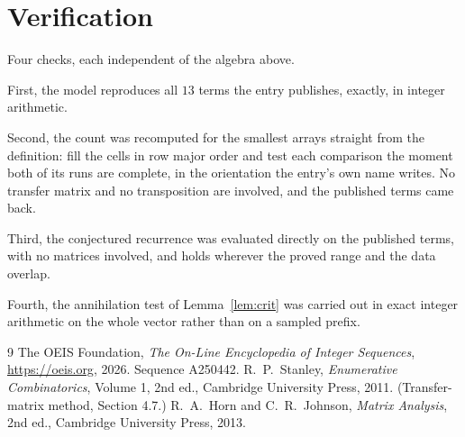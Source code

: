 \documentclass[11pt,a4paper]{article}
\theoremstyle{plain}
\theoremstyle{definition}
\begin{document}
\section{Verification}

Four checks, each independent of the algebra above.

First, the model reproduces all $13$ terms the entry publishes, exactly, in integer
arithmetic.

Second, the count was recomputed for the smallest arrays straight from the definition: fill the
cells in row major order and test each comparison the moment both of its runs are complete,
in the orientation the entry's own name writes. No transfer matrix and no transposition are
involved, and the published terms came back.

Third, the conjectured recurrence was evaluated directly on the published terms, with no
matrices involved, and holds wherever the proved range and the data overlap.

Fourth, the annihilation test of Lemma~\ref{lem:crit} was carried out in exact integer
arithmetic on the whole vector rather than on a sampled prefix.

\begin{thebibliography}{9}
 The OEIS Foundation, \emph{The On-Line Encyclopedia of Integer
Sequences}, \url{https://oeis.org}, 2026. Sequence A250442.
 R.~P.~Stanley, \emph{Enumerative Combinatorics}, Volume 1, 2nd ed.,
Cambridge University Press, 2011. (Transfer-matrix method, Section 4.7.)
 R.~A.~Horn and C.~R.~Johnson, \emph{Matrix Analysis}, 2nd ed., Cambridge
University Press, 2013.
\end{thebibliography}
\end{document}

